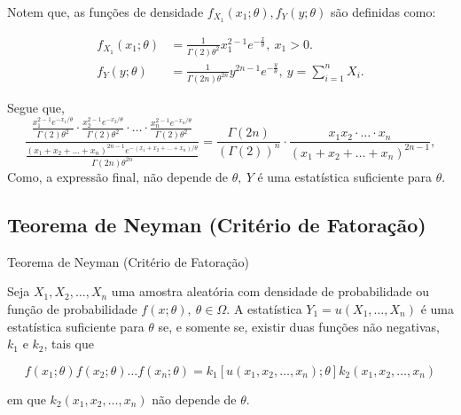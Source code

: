 \documentclass[12pt]{beamer}
\begin{document}
\begin{frame}{}
\begin{block}{}
\justifying
Notem que, as funções de densidade $f_{X_{1}}(x_{1};\theta), f_{Y}(y;\theta)$ são definidas como:

\begin{align*}
f_{X_{1}}(x_{1};\theta) &= 
\frac{1}{\Gamma(2)\theta^{2}}x_1^{2-1}e^{-\frac{x}{\theta}},~x_{1}>0.\\
f_{Y}(y;\theta) &= 
\frac{1}{\Gamma(2n)\theta^{2n}}y^{2n-1}e^{-\frac{y}{\theta}}, ~y={\displaystyle \sum_{i=1}^{n}X_{i}}.
\end{align*}
\end{block}
\end{frame}

\begin{frame}{}
\begin{block}{}
\justifying
Segue que,
\begin{equation*}
\dfrac{\frac{x_1^{2-1}e^{-x_1/\theta}}{\Gamma(2)\theta^2} \cdot \frac{x_2^{2-1}e^{-x_2/\theta}}{\Gamma(2)\theta^2} \cdot \ldots \cdot \frac{x_n^{2-1}e^{-x_n/\theta}}{\Gamma(2)\theta^2}}{\frac{(x_1 + x_2 + \ldots + x_n)^{2n-1}e^{-(x_1+x_2+\ldots+x_n)/\theta}}{\Gamma(2n)\theta^{2n}}}=\frac{\Gamma(2n)}{(\Gamma(2))^n} \cdot \frac{x_1x_2\cdot\ldots\cdot x_n}{(x_1 + x_2 + \ldots + x_n)^{2n-1}},
\end{equation*}
Como, a expressão final, não depende de $\theta,~Y$ é uma estatística suficiente para $\theta.$ 
\end{block}
\end{frame}

\subsection{Teorema de Neyman (Critério de Fatoração)}
\begin{frame}{Teorema de Neyman (Critério de Fatoração)}
\begin{block}{}
\begin{Teorema}
\justifying
    Seja $X_1, X_2, \ldots, X_n$ uma amostra aleatória com densidade de probabilidade ou função de probabilidade $f(x; \theta), ~\theta \in \Omega$. A estatística $Y_1 = u(X_1, \ldots, X_n)$ é uma estatística suficiente para $\theta$ se, e somente se, existir duas funções não negativas, $k_1$ e $k_2$, tais que

\begin{equation*}
f(x_1; \theta)f(x_2; \theta) \ldots f(x_n; \theta) = k_1[u(x_1, x_2, \ldots, x_n); \theta]k_2(x_1, x_2, \ldots, x_n)
\end{equation*}

em que $k_2(x_1, x_2, \ldots, x_n)$ não depende de $\theta$.
\end{Teorema}
\end{block}
\end{frame}
\end{document}
